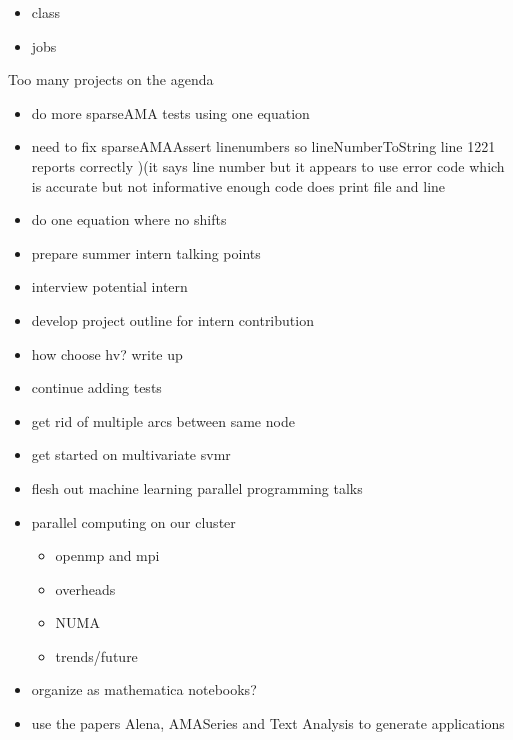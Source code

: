 \documentclass[hyperref]{labbook}
\begin{document}
\begin{itemize}
\item class
\item jobs
\end{itemize}



Too many projects on the agenda

\begin{itemize}
\item do more sparseAMA tests using one equation
\item need to fix sparseAMAAssert linenumbers so lineNumberToString line 1221 reports correctly  )(it says line number but it appears to use error code which is accurate but not informative enough code does print file and line
\item do one equation where no shifts
\end{itemize}


\begin{itemize}
\item prepare summer intern talking points
\item interview potential intern
\item develop project outline for intern contribution
\item how choose hv?  write up
\end{itemize}

\begin{itemize}
\item continue adding tests
\item get rid of multiple arcs between same node
\item get started on multivariate svmr
\end{itemize}


\begin{itemize}
\item flesh out machine learning parallel programming talks
\item parallel computing on our cluster
  \begin{itemize}
  \item openmp and mpi
  \item overheads
  \item NUMA
  \item trends/future
  \end{itemize}
\item organize as mathematica notebooks?
\item use the papers Alena, AMASeries and Text Analysis to generate applications
\end{itemize}
\end{document}

